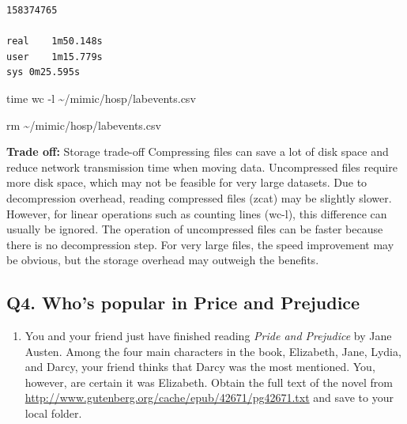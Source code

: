 \documentclass[
]{article}
\newenvironment{Shaded}{\begin{snugshade}}{\end{snugshade}}
\newcommand{\FunctionTok}[1]{\textcolor[rgb]{0.28,0.35,0.67}{#1}}
\newcommand{\NormalTok}[1]{\textcolor[rgb]{0.00,0.23,0.31}{#1}}
\providecommand{\tightlist}{%
  \setlength{\itemsep}{0pt}\setlength{\parskip}{0pt}}\usepackage{longtable,booktabs,array}
\begin{document}
\begin{verbatim}
158374765

real    1m50.148s
user    1m15.779s
sys 0m25.595s
\end{verbatim}

\begin{Shaded}
\begin{Highlighting}[]
\NormalTok{time wc {-}l \textasciitilde{}/mimic/hosp/labevents.csv }
\end{Highlighting}
\end{Shaded}

\begin{Shaded}
\begin{Highlighting}[]
\FunctionTok{rm}\NormalTok{ \textasciitilde{}/mimic/hosp/labevents.csv}
\end{Highlighting}
\end{Shaded}

\textbf{Trade off:} Storage trade-off Compressing files can save a lot
of disk space and reduce network transmission time when moving data.
Uncompressed files require more disk space, which may not be feasible
for very large datasets. Due to decompression overhead, reading
compressed files (zcat) may be slightly slower. However, for linear
operations such as counting lines (wc-l), this difference can usually be
ignored. The operation of uncompressed files can be faster because there
is no decompression step. For very large files, the speed improvement
may be obvious, but the storage overhead may outweigh the benefits.

\hypertarget{q4.-whos-popular-in-price-and-prejudice}{%
\subsection{Q4. Who's popular in Price and
Prejudice}\label{q4.-whos-popular-in-price-and-prejudice}}

\begin{enumerate}
\def\labelenumi{\arabic{enumi}.}
\tightlist
\item
  You and your friend just have finished reading \emph{Pride and
  Prejudice} by Jane Austen. Among the four main characters in the book,
  Elizabeth, Jane, Lydia, and Darcy, your friend thinks that Darcy was
  the most mentioned. You, however, are certain it was Elizabeth. Obtain
  the full text of the novel from
  \url{http://www.gutenberg.org/cache/epub/42671/pg42671.txt} and save
  to your local folder.
\end{enumerate}
\end{document}
